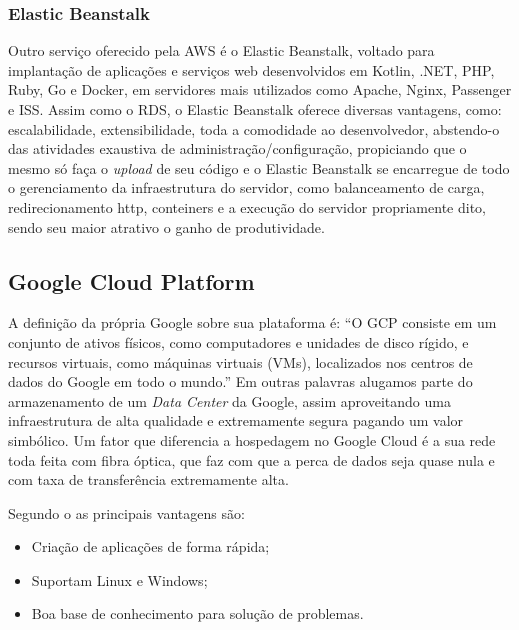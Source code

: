 \subsubsection{Elastic Beanstalk}
Outro serviço oferecido pela AWS é o Elastic Beanstalk, voltado para implantação de aplicações e serviços web desenvolvidos em Kotlin, .NET, PHP, Ruby, Go e Docker, em servidores mais utilizados como Apache, Nginx, Passenger e ISS. 
Assim como o RDS, o Elastic Beanstalk oferece diversas vantagens, como: escalabilidade, extensibilidade, toda a comodidade ao desenvolvedor, abstendo-o das atividades exaustiva de administração/configuração, propiciando que o mesmo só faça o \textit{upload} de seu código e o Elastic Beanstalk se encarregue de todo o gerenciamento da infraestrutura do servidor, como balanceamento de carga, redirecionamento http, conteiners e a execução do servidor propriamente dito, sendo seu maior atrativo o ganho de produtividade.
\cite{elasticbean}


\subsection{Google Cloud Platform}
A definição da própria Google sobre sua plataforma é: “O GCP consiste em um conjunto de ativos físicos, como computadores e unidades de disco rígido, e recursos virtuais, como máquinas virtuais (VMs), localizados nos centros de dados do Google em todo o mundo.” Em outras palavras alugamos parte do armazenamento de um \textit{Data Center} da Google, assim aproveitando uma infraestrutura de alta qualidade e extremamente segura pagando um valor simbólico.
Um fator que diferencia a hospedagem no Google Cloud é a sua rede toda feita com fibra óptica, que faz com que a perca de dados seja quase nula e com taxa de transferência extremamente alta. 
\cite{googlecp}

Segundo o \cite{googlecp} as principais vantagens são:
\begin{itemize}
\item Criação de aplicações de forma rápida;
\item Suportam Linux e Windows;
\item Boa base de conhecimento para solução de problemas.
\end{itemize}

